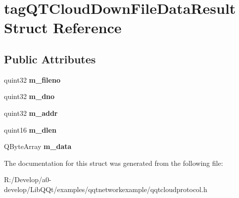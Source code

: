 \hypertarget{structtag_q_t_cloud_down_file_data_result}{}\section{tag\+Q\+T\+Cloud\+Down\+File\+Data\+Result Struct Reference}
\label{structtag_q_t_cloud_down_file_data_result}
\subsection*{Public Attributes}
\begin{DoxyCompactItemize}
\item 
\mbox{\label{structtag_q_t_cloud_down_file_data_result_a5522bf1087ff9cf2bd1d15027c6f3e5c}} 
quint32 {\bfseries m\+\_\+fileno}
\item 
\mbox{\label{structtag_q_t_cloud_down_file_data_result_ab5fe61123032eb5672743501c1266bcd}} 
quint32 {\bfseries m\+\_\+dno}
\item 
\mbox{\label{structtag_q_t_cloud_down_file_data_result_a6ad1a7c802064c0d9ffcf64ac6f76628}} 
quint32 {\bfseries m\+\_\+addr}
\item 
\mbox{\label{structtag_q_t_cloud_down_file_data_result_a01660ef21fcaf3828f77e8d297d2ec02}} 
quint16 {\bfseries m\+\_\+dlen}
\item 
\mbox{\label{structtag_q_t_cloud_down_file_data_result_a803615c038f1a038b94e35797cf61c83}} 
Q\+Byte\+Array {\bfseries m\+\_\+data}
\end{DoxyCompactItemize}


The documentation for this struct was generated from the following file\+:\begin{DoxyCompactItemize}
\item 
R\+:/\+Develop/a0-\/develop/\+Lib\+Q\+Qt/examples/qqtnetworkexample/qqtcloudprotocol.\+h\end{DoxyCompactItemize}
